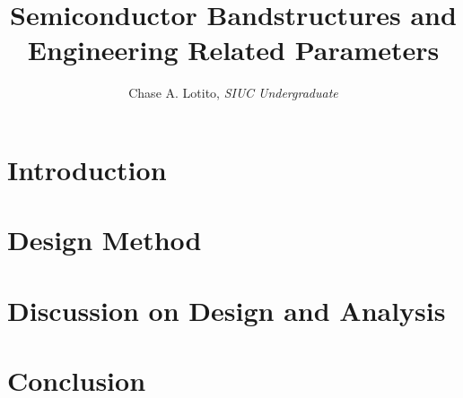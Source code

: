 \documentclass{IEEEtran}
\title{Semiconductor Bandstructures and Engineering Related Parameters}
\author{Chase A. Lotito, \textit{SIUC Undergraduate}}
\date{}
\begin{document}
\maketitle %

\begin{abstract}
\end{abstract}

\section{Introduction}

\section{Design Method}

\section{Discussion on Design and Analysis}

\section{Conclusion}
\end{document}

